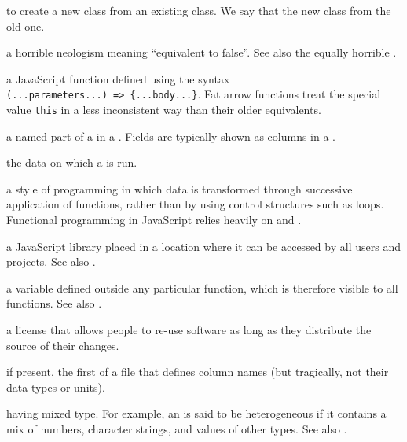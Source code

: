 \begin{description}
to create a new class from an existing class. We say that the new class
 from the old one.

a horrible neologism meaning ``equivalent to false''. See also the equally
horrible .

a JavaScript function defined using the syntax \texttt{(...parameters...)\ ={\textgreater}{}\ \{...body...\}}. Fat arrow functions treat the special value \texttt{this} in a less
inconsistent way than their older equivalents.

a named part of a  in a . Fields are typically shown as columns in a
.

the data on which a  is run.

a style of programming in which data is transformed through successive
application of functions, rather than by using control structures such as
loops. Functional programming in JavaScript relies heavily on
 and .

a JavaScript library placed in a location where it can be accessed by all
users and projects. See also .

a variable defined outside any particular function, which is therefore visible
to all functions. See also .

a license that allows people to re-use software as long as they distribute
the source of their changes.

if present, the first of a  file that defines column names (but
tragically, not their data types or units).

having mixed type. For example, an  is said to be
heterogeneous if it contains a mix of numbers, character strings, and values
of other types. See also .


\end{description}
